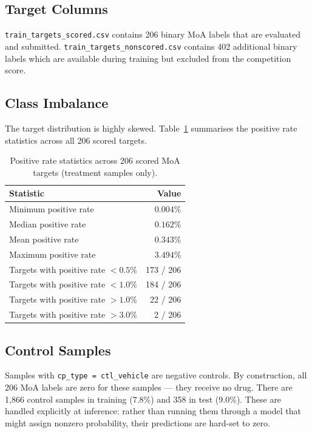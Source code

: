 \documentclass[12pt, a4paper]{article}
\begin{document}
\subsection{Target Columns}

\texttt{train\_targets\_scored.csv} contains 206 binary MoA labels that are evaluated and submitted. \texttt{train\_targets\_nonscored.csv} contains 402 additional binary labels which are available during training but excluded from the competition score.

\subsection{Class Imbalance}

The target distribution is highly skewed. Table~\ref{tab:imbalance} summarises the positive rate statistics across all 206 scored targets.

\begin{table}[h!]
\centering
\caption{Positive rate statistics across 206 scored MoA targets (treatment samples only).}
\label{tab:imbalance}
\begin{tabular}{lr}
\toprule
\textbf{Statistic} & \textbf{Value} \\
\midrule
Minimum positive rate & $0.004\%$ \\
Median positive rate  & $0.162\%$ \\
Mean positive rate    & $0.343\%$ \\
Maximum positive rate & $3.494\%$ \\
\midrule
Targets with positive rate $< 0.5\%$ & 173 / 206 \\
Targets with positive rate $< 1.0\%$ & 184 / 206 \\
Targets with positive rate $> 1.0\%$ & 22 / 206  \\
Targets with positive rate $> 3.0\%$ & 2 / 206   \\
\bottomrule
\end{tabular}
\end{table}

\subsection{Control Samples}

Samples with \texttt{cp\_type = ctl\_vehicle} are negative controls. By construction, all 206 MoA labels are zero for these samples — they receive no drug. There are 1,866 control samples in training ($7.8\%$) and 358 in test ($9.0\%$). These are handled explicitly at inference: rather than running them through a model that might assign nonzero probability, their predictions are hard-set to zero.
\end{document}
